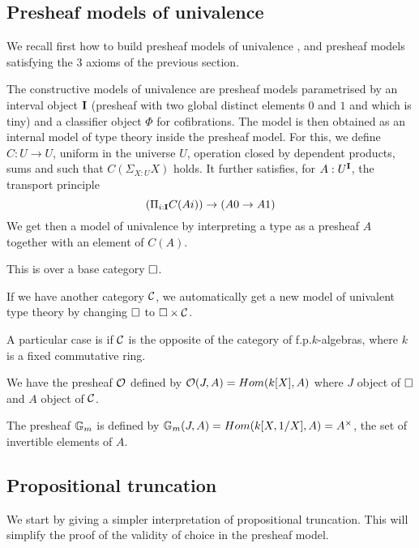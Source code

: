 
    \subsection{Presheaf models of univalence}

    We recall first how to build presheaf models of univalence \cite{CCHM,survey},
    and presheaf models satisfying the 3 axioms of the previous section.

The constructive models of univalence are presheaf models parametrised by an interval object $\mathbf{I}$
(presheaf with two global distinct elements $0$ and $1$ and which is tiny) and a classifier object
$\Phi$ for cofibrations. The model is then obtained as an internal model of type theory inside the
presheaf model. For this, we define $C:U\rightarrow U$, uniform in the universe $U$, operation
closed by dependent products, sums and such that $C(\Sigma_{X:U}X)$ holds. It further satisfies, for $A:U^{\mathbf{I}}$, the transport principle
$$
(\Pi_{i:\mathbf{I}}C(Ai))\rightarrow (A0\rightarrow A1)
$$
We get then a model of univalence by interpreting a type as a presheaf $A$ together with an element
of $C(A)$.

 This is over a base category $\square$.
 
 If we have another category $\mathcal{C}$, we automatically get a new model of univalent type theory by
 changing $\square$ to $\square\times\mathcal{C}$.

 A particular case is if $\mathcal{C}$ is the opposite of the category of f.p.\@ $k$-algebras, where $k$ is a
 fixed commutative ring.

 We have the presheaf $\mathcal O$ defined by $\mathcal O(J,A) = Hom(k[X],A)$ where $J$ object of $\square$ and $A$ object of $\mathcal{C}$.

  The presheaf $\mathbb{G}_m$ is defined by $\mathbb{G}_m(J,A) = Hom(k[X,1/X],A) = A^{\times}$, the set of invertible elements of $A$.

\subsection{Propositional truncation}

    We start by giving a simpler interpretation of propositional truncation. This will simplify
    the proof of the validity of choice in the presheaf model.

